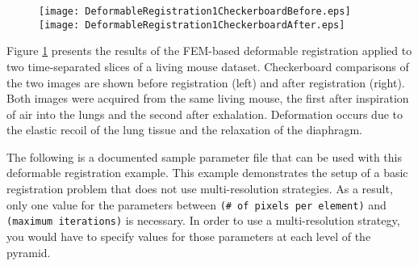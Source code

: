 %
%
%
%
%
%

 
\begin{figure} \center
\texttt{[image: DeformableRegistration1CheckerboardBefore.eps]}
\texttt{[image: DeformableRegistration1CheckerboardAfter.eps]}
\label{fig:DeformableRegistration1Output}
\end{figure}

\ifitkFullVersion

\fi

Figure \ref{fig:DeformableRegistration1Output} presents the results of
the FEM-based deformable registration applied to two time-separated
slices of a living mouse dataset.  Checkerboard comparisons of the two
images are shown before registration (left) and after registration
(right).  Both images were acquired from the same living mouse, the
first after inspiration of air into the lungs and the second after
exhalation.  Deformation occurs due to the elastic recoil of the lung
tissue and the relaxation of the diaphragm.

The following is a documented sample parameter file that can be used with this
deformable registration example.  This example demonstrates the setup of a
basic registration problem that does not use multi-resolution strategies.  As a
result, only one value for the parameters between \texttt{(\# of pixels per
element)} and \texttt{(maximum iterations)} is necessary.  In order to use a
multi-resolution strategy, you would have to specify values for those
parameters at each level of the pyramid.




